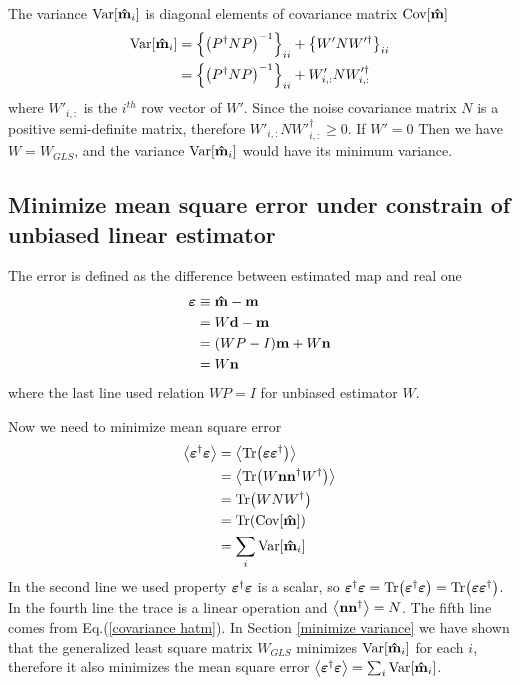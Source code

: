 \documentclass[11pt, letterpaper]{article}
\newcommand{\Var}[1]{\text{Var}\qty[#1]}
\newcommand{\Cov}[1]{\text{Cov}\qty[#1]}
\newcommand{\vbd}{\vb{d}}
\newcommand{\vbm}{\vb{m}}
\newcommand{\vbep}{\vb*{\varepsilon}}
\newcommand{\vbn}{\vb{n}}
\newcommand{\inv}[1]{#1^{-1}}
\newcommand{\hatm}{\vb{\hat{m}}}
\newcommand{\Pdagger}{P^{\dagger}}
\newcommand{\PPinv}[1]{\inv{\qty(\Pdagger #1 P)}}
\begin{document}
The variance $\Var{\hatm_i}$ is diagonal elements of covariance matrix
$\Cov{\hatm}$
\begin{align}
\begin{aligned}[b]
\Var{\hatm_i}
&= \qty\Big{ \PPinv{N}}_{ii} + \qty\big{W' N W'^{\dagger}}_{ii}
\\
&= \qty\Big{ \PPinv{N}}_{ii} + W'_{i,:} N W'^{\dagger}_{i,:}
\end{aligned}
\end{align}
where $W'_{i,:}$ is the $i^{th}$ row vector of $W'$.
Since the noise covariance matrix $N$ is a positive semi-definite matrix,
therefore $W'_{i,:} N W'^{\dagger}_{i,:} \geq 0$.
If $W' = 0$ Then we have $W = W_{GLS}$, and the variance $\Var{\hatm_i}$ would have 
its minimum variance. 

\subsection{Minimize mean square error under constrain of unbiased linear 
estimator}
The error is defined as the difference between estimated map and real one
\begin{align}
\begin{aligned}[b]
\vbep &\equiv \hatm - \vbm
\\
&= W\vbd - \vbm
\\
&= (WP-I)\vbm + W\vbn
\\
&= W\vbn
\end{aligned}
\end{align}
where the last line used relation $WP=I$ for unbiased estimator $W$. 

Now we need to minimize mean square error
\begin{align}
\begin{aligned}[b]
\ev{\vbep^{\dagger} \vbep }
&= \ev{\Tr(\vbep \vbep^{\dagger})}
\\
&=\ev{\Tr(W\vbn \vbn^{\dagger} W^{\dagger}) }
\\
&= \Tr(W N W^{\dagger})
\\
&= \Tr(\Cov{\hatm})\\
&= \sum_i \Var{\hatm_i}
\end{aligned}
\end{align}
In the second line we used property $\vbep^{\dagger} \vbep$ is a scalar,
so $\vbep^{\dagger} \vbep = \Tr(\vbep^{\dagger} \vbep) 
= \Tr(\vbep \vbep^{\dagger})$.
In the fourth line the trace is a linear operation 
and $\ev{\vbn \vbn^{\dagger} } = N$. 
The fifth line comes from Eq.(\ref{covariance hatm}).
In Section \ref{minimize variance} we have shown that the generalized least 
square matrix $W_{GLS}$ minimizes $\Var{\hatm_i}$ for each $i$, 
therefore it also minimizes the mean square error
$\ev{\vbep^{\dagger} \vbep} = \sum_i \Var{\hatm_i}$. 
\end{document}
